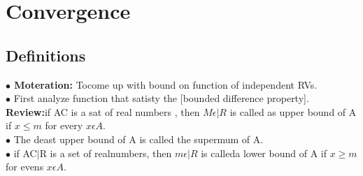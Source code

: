 \documentclass[journal,12pt,twocolumn]{IEEEtran}
\begin{document}
% 



\maketitle
\section{Convergence}
\subsection{Definitions}
\textbf{$\bullet$ Moteration:} Tocome up with bound on function of independent RVs.\\

$\bullet$ First analyze function that satisty the [bounded difference property].\\

\textbf{Review:}if AC is a sat of real numbers , then $M\epsilon |R $ is called as upper bound of A if $ x\leqslant m$ for every $x\epsilon A$.\\

$\bullet$ The deast upper bound of A is called the supermum of A.\\

$\bullet$ if AC$|$R is a set of realnumbers, then $m\epsilon |R$ is calleda lower bound of A if  $x\geqslant m$ for evens $x\epsilon A.$\\
\end{document}
